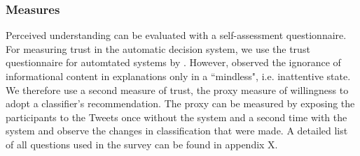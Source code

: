\subsubsection{Measures}
Perceived understanding can be evaluated with a self-assessment questionnaire.\newline
For measuring trust in the automatic decision system, we use the trust questionnaire for automtated systems by \cite{ruping2006learning}. However, \cite{langer1978mindlessness} observed the ignorance of informational content in explanations only in a ``mindless", i.e. inattentive state. We therefore use a second measure of trust, the proxy measure of willingness to adopt a classifier's recommendation. The proxy can be measured by exposing the participants to the Tweets once without the system and a second time with the system and observe the changes in classification that were made. A detailed list of all questions used in the survey can be found in appendix {\color{red}X}.

